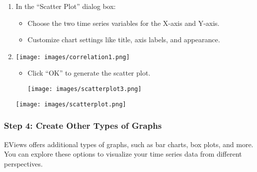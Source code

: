 \documentclass[
  letterpaper,
  DIV=11,
  numbers=noendperiod]{scrartcl}
\begin{document}
\begin{enumerate}
\def\labelenumi{\arabic{enumi}.}
\item
  In the ``Scatter Plot'' dialog box:

  \begin{itemize}
  \item
    Choose the two time series variables for the X-axis and Y-axis.
  \item
    Customize chart settings like title, axis labels, and appearance.
  \end{itemize}
\item
  \texttt{[image: images/correlation1.png]}

  \begin{itemize}
  \item
    Click ``OK'' to generate the scatter plot.

    \texttt{[image: images/scatterplot3.png]}
  \end{itemize}

  \texttt{[image: images/scatterplot.png]}
\end{enumerate}

\hypertarget{step-4-create-other-types-of-graphs}{%
\subsubsection{\texorpdfstring{\textbf{Step 4: Create Other Types of
Graphs}}{Step 4: Create Other Types of Graphs}}\label{step-4-create-other-types-of-graphs}}

EViews offers additional types of graphs, such as bar charts, box plots,
and more. You can explore these options to visualize your time series
data from different perspectives.
\end{document}
